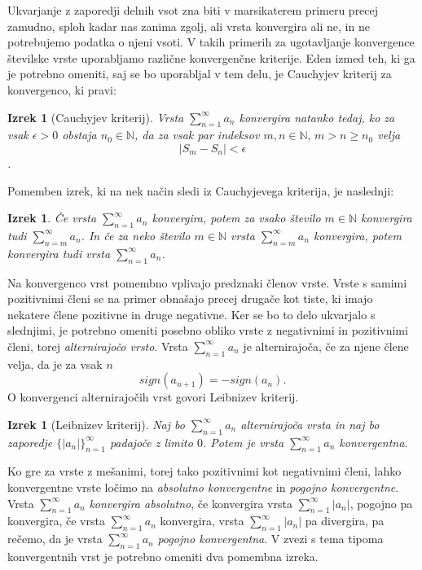 \documentclass[12pt,a4paper,reqno]{amsart}
\theoremstyle{definition} %
\theoremstyle{plain} %
\newtheorem{izrek}[definicija]{Izrek}
\newcommand{\N}{\mathbb N}
\begin{document}
Ukvarjanje z zaporedji delnih vsot zna biti v marsikaterem primeru precej zamudno, sploh kadar nas zanima zgolj, ali vrsta konvergira ali ne, in ne potrebujemo podatka o njeni vsoti. V takih primerih za ugotavljanje konvergence številske vrste uporabljamo različne konvergenčne kriterije. Eden izmed teh, ki ga je potrebno omeniti, saj se bo uporabljal v tem delu, je Cauchyjev kriterij za konvergenco, ki pravi: 
\begin{izrek}[Cauchyjev kriterij]\label{izr:cauchy}
Vrsta $\sum^{\infty}_{n=1}a_n$ konvergira natanko tedaj, ko za vsak $\epsilon >0$ obstaja $n_0 \in \N$, da za vsak par indeksov $m,n\in \N \textrm{, }m>n\geq n_0$ velja $$|S_m-S_n|<\epsilon$$.
\end{izrek}
Pomemben izrek, ki na nek način sledi iz Cauchyjevega kriterija, je naslednji:
\begin{izrek}\label{izr:ostanek}
Če vrsta $\sum^{\infty}_{n=1}a_n$ konvergira, potem za vsako število $m\in \N$ konvergira tudi $\sum^{\infty}_{n=m}a_n$. In če za neko število $m \in \N$ vrsta $\sum^{\infty}_{n=m}a_n$ konvergira, potem konvergira tudi vrsta $\sum^{\infty}_{n=1}a_n$.
\end{izrek}

Na konvergenco vrst pomembno vplivajo predznaki členov vrste. Vrste s samimi pozitivnimi členi se na primer obnašajo precej drugače kot tiste, ki imajo nekatere člene pozitivne in druge negativne. Ker se bo to delo ukvarjalo s slednjimi, je potrebno omeniti posebno obliko vrste z negativnimi in pozitivnimi členi, torej \emph{alternirajočo vrsto}. Vrsta $\sum^{\infty}_{n=1}a_n$ je alternirajoča, če za njene člene velja, da je za vsak $n$ $$sign(a_{n+1})=-sign(a_n).$$ O konvergenci alternirajočih vrst govori Leibnizev kriterij.

\begin{izrek}[Leibnizev kriterij]\label{izr:leibnitz}
Naj bo $\sum^{\infty}_{n=1}a_n$ alternirajoča vrsta in naj bo zaporedje $\{|a_n|\}_{n=1}^{\infty}$ padajoče z limito $0$. Potem je vrsta $\sum^{\infty}_{n=1}a_n$ konvergentna.
\end{izrek}

Ko gre za vrste z mešanimi, torej tako pozitivnimi kot negativnimi členi, lahko konvergentne vrste ločimo na \emph{absolutno konvergentne} in \emph{pogojno konvergentne}. Vrsta $\sum^{\infty}_{n=1}a_n$ \emph{konvergira absolutno}, če konvergira vrsta $\sum^{\infty}_{n=1}|a_n|$, pogojno pa konvergira, če vrsta $\sum^{\infty}_{n=1}a_n$ konvergira, vrsta $\sum^{\infty}_{n=1}|a_n|$ pa divergira, pa rečemo, da je vrsta $\sum^{\infty}_{n=1}a_n$ \emph{pogojno konvergentna}. V zvezi s tema tipoma konvergentnih vrst je potrebno omeniti dva pomembna izreka.
\end{document}
